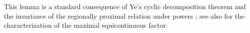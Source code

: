 \documentclass[reqno,12pt]{amsart}
\def \Z {\mathbb Z}
\numberwithin{equation}{section}
\begin{document}
This lemma is a standard consequence of Ye's cyclic decomposition theorem
\cite[Theorem~3.1]{Ye92} and the invariance of the regionally proximal
relation under powers
\cite[Lemma~2.7, p.~290]{GlasnerHuangShaoWeissYe25}; see also
\cite[Theorem~2.6, pp.~289--290]{GlasnerHuangShaoWeissYe25} for the
characterization of the maximal equicontinuous factor.

\end{document}
